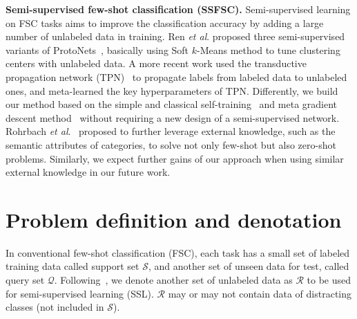 \documentclass{article}
\newcommand{\myparagraph}[1]{\vspace{0.1em}\noindent\textbf{#1}}
\begin{document}
\myparagraph{Semi-supervised few-shot classification (SSFSC).}
Semi-supervised learning on FSC tasks aims to improve the classification accuracy by adding a large number of unlabeled data in training.
Ren \emph{et al}. proposed three semi-supervised variants of ProtoNets~\cite{SnellSZ17}, basically using Soft $k$-Means method to tune clustering centers with unlabeled data.
A more recent work used
the transductive propagation network (TPN)~\cite{LiuICLR2019transductive} to propagate labels from labeled data to unlabeled ones, and
meta-learned the key hyperparameters of TPN.
Differently, we build our method based on the simple and classical self-training~\cite{Yarowsky95self_training} and meta gradient descent method~\cite{FinnAL17, SunCVPR2019} without requiring a new design of a semi-supervised network.
Rohrbach \emph{et al}.~\cite{RohrbachNIPS13transfer} proposed to further leverage external knowledge, such as the semantic attributes of categories, to solve not only few-shot but also zero-shot problems. Similarly, we expect further gains of our approach when using similar external knowledge in our future work.



\section{Problem definition and denotation}

In conventional few-shot classification (FSC), each task has a small set of labeled training data called support set $\mathcal{S}$, and another set of unseen data for test, called query set $\mathcal{Q}$. 
Following~\cite{RenICLR2018_semisupervised}, we denote another set of unlabeled data as $\mathcal{R}$ to be used for semi-supervised learning (SSL). $\mathcal{R}$ may or may not contain data of distracting classes (not included in $\mathcal{S}$).
\end{document}
